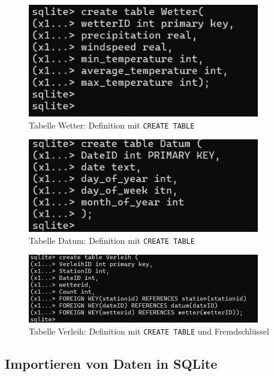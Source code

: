 \documentclass{article}
\begin{document}
\begin{figure}[h!]
    \centering
    \includegraphics[width=0.9\textwidth]{Nummer 2.jpg}
    \caption{Tabelle Wetter: Definition mit \texttt{CREATE TABLE}}
    \label{fig:table-wetter}
\end{figure}

\begin{figure}[h!]
    \centering
    \includegraphics[width=0.9\textwidth]{Nummer 3.jpg}
    \caption{Tabelle Datum: Definition mit \texttt{CREATE TABLE}}
    \label{fig:table-datum}
\end{figure}

\begin{figure}[h!]
    \centering
    \includegraphics[width=0.9\textwidth]{Nummer 4.jpg}
    \caption{Tabelle Verleih: Definition mit \texttt{CREATE TABLE} und Fremdschlüssel}
    \label{fig:table-verleih}
\end{figure}

\newpage
\newpage 

\subsection{Importieren von Daten in SQLite}
\label{sec:sqlite-import}
\end{document}
